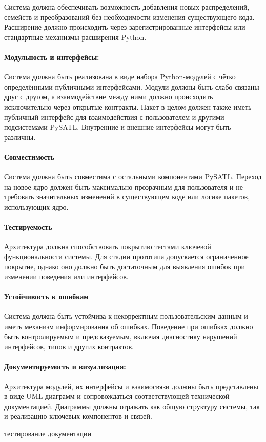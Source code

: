 Система должна обеспечивать возможность добавления новых распределений, семейств и преобразований без необходимости изменения существующего кода. Расширение должно происходить через зарегистрированные интерфейсы или стандартные механизмы расширения Python.

\paragraph{Модульность и интерфейсы:}

Система должна быть реализована в виде набора Python-модулей с чётко определёнными публичными интерфейсами. Модули должны быть слабо связаны друг с другом, а взаимодействие между ними должно происходить исключительно через открытые контракты. Пакет в целом должен также иметь публичный интерфейс для взаимодействия с пользователем и другими подсистемами PySATL. Внутренние и внешние интерфейсы могут быть различны.

\paragraph{Совместимость}

Система должна быть совместима с остальными компонентами PySATL. Переход на новое ядро должен быть максимально прозрачным для пользователя и не требовать значительных изменений в существующем коде или логике пакетов, использующих ядро.

\paragraph{Тестируемость}

Архитектура должна способствовать покрытию тестами ключевой функциональности системы. Для стадии прототипа допускается ограниченное покрытие, однако оно должно быть достаточным для выявления ошибок при изменении поведения или интерфейсов.

\paragraph{Устойчивость к ошибкам}

Система должна быть устойчива к некорректным пользовательским данным и иметь механизм информирования об ошибках. Поведение при ошибках должно быть контролируемым и предсказуемым, включая диагностику нарушений интерфейсов, типов и других контрактов.

\paragraph{Документируемость и визуализация:}
Архитектура модулей, их интерфейсы и взаимосвязи должны быть представлены в виде UML-диаграмм и сопровождаться соответствующей технической документацией. Диаграммы должны отражать как общую структуру системы, так и реализацию ключевых компонентов и связей.

тестирование документации